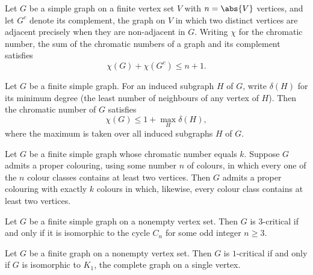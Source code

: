 \begin{theorem}
\label{SimpleGraph.nordhaus_gaddum}
\leanok
Let $G$ be a simple graph on a finite vertex set $V$ with $n = \abs{V}$ vertices, and
let $G^{c}$ denote its complement, the graph on $V$ in which two distinct vertices are
adjacent precisely when they are non-adjacent in $G$. Writing $\chi$ for the chromatic
number, the sum of the chromatic numbers of a graph and its complement satisfies \[
\chi(G) + \chi(G^{c}) \le n + 1. \]
\end{theorem}

\begin{theorem}
\label{SimpleGraph.szekeres_wilf}
\leanok
Let $G$ be a finite simple graph. For an induced subgraph $H$ of $G$, write $\delta(H)$
for its minimum degree (the least number of neighbours of any vertex of $H$). Then the
chromatic number of $G$ satisfies
\[
\chi(G) \le 1 + \max_{H} \delta(H),
\]
where the maximum is taken over all induced subgraphs $H$ of $G$.
\end{theorem}

\begin{theorem}
\label{SimpleGraph.gallai_two_per_class}
\leanok
Let $G$ be a finite simple graph whose chromatic number equals $k$. Suppose $G$ admits a
proper colouring, using some number $n$ of colours, in which every one of the $n$ colour
classes contains at least two vertices. Then $G$ admits a proper colouring with exactly
$k$ colours in which, likewise, every colour class contains at least two vertices.
\end{theorem}

\begin{theorem}
\label{SimpleGraph.isKCritical_three_iff_odd_cycle}
\leanok
{}
Let $G$ be a finite simple graph on a nonempty vertex set. Then $G$ is $3$-critical if
and only if it is isomorphic to the cycle $C_n$ for some odd integer $n \ge 3$.
\end{theorem}

\begin{theorem}
\label{SimpleGraph.isKCritical_one_iff}
\leanok
{}
Let $G$ be a finite graph on a nonempty vertex set. Then $G$ is $1$-critical if and only
if $G$ is isomorphic to $K_1$, the complete graph on a single vertex.
\end{theorem}


